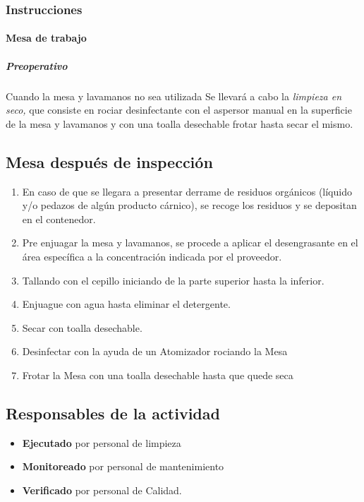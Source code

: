 \subsubsection{Instrucciones}
\paragraph{Mesa de trabajo}
\subparagraph{Preoperativo}
Cuando la mesa y lavamanos no sea utilizada Se llevará a cabo la \emph{limpieza en seco,} que consiste en rociar desinfectante con el aspersor manual en la superficie de la mesa y lavamanos y con una toalla desechable frotar hasta secar el mismo.

\subsection{Mesa después de inspección}

\begin{enumerate}
	\item En caso de que se llegara a presentar derrame de residuos orgánicos (líquido y/o pedazos de algún producto cárnico), se recoge los residuos y se depositan en el contenedor.
	\item Pre enjuagar la mesa y lavamanos, se procede a aplicar el desengrasante en el área específica a la concentración indicada por el proveedor.
	\item Tallando con el cepillo iniciando de la parte superior hasta la inferior.
	\item Enjuague con agua hasta eliminar el detergente.
	\item Secar con toalla desechable.
	\item Desinfectar con la ayuda de un Atomizador rociando la Mesa
	\item Frotar la Mesa con una toalla desechable hasta que quede seca
\end{enumerate}

\subsection{Responsables de la actividad}

\begin{itemize}
	\item \textbf{Ejecutado} por personal de limpieza
	\item \textbf{Monitoreado} por personal de mantenimiento
	\item \textbf{Verificado} por personal de Calidad.
\end{itemize}

